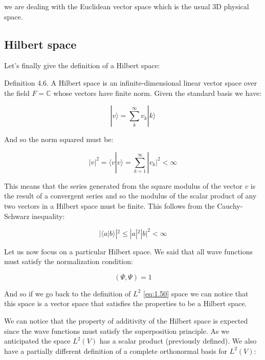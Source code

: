 \documentclass[italian]{HKNdocument}
\begin{document}
we are dealing with the Euclidean vector space which is the usual 3D physical space.


\subsection{Hilbert space}

Let's finally give the definition of a Hilbert space:

Definition 4.6. A Hilbert space is an infinite-dimensional linear vector space over the field $F = \mathbb{C}$ whose vectors have finite norm. Given the standard basis we have:

\begin{equation}
|v\rangle = \sum_{k}^{\infty} v_k|k\rangle \label{eq:4.13}
\end{equation}

And so the norm squared must be:

\begin{equation}
|v|^2 = \langle v|v\rangle = \sum_{k=1}^{\infty}|v_k|^2 < \infty \label{eq:4.14}
\end{equation}

This means that the series generated from the square modulus of the vector $v$ is the result of a convergent series and so the modulus of the scalar product of any two vectors in a Hilbert space must be finite. This follows from the Cauchy-Schwarz inequality:

\begin{equation}
|\langle a|b\rangle|^2 \leq |a|^2|b|^2 < \infty \label{eq:4.15}
\end{equation}

Let us now focus on a particular Hilbert space. We said that all wave functions must satisfy the normalization condition:

\begin{equation}
(\Psi, \Psi) = 1 \label{eq:4.16}
\end{equation}

And so if we go back to the definition of $L^2$ \eqref{eq:1.50} space we can notice that this space is a vector space that satisfies the properties to be a Hilbert space.

We can notice that the property of additivity of the Hilbert space is expected since the wave functions must satisfy the superposition principle. As we anticipated the space $L^2(V)$ has a scalar product (previously defined). We also have a partially different definition of a complete orthonormal basis for $L^2(V)$:
\end{document}
